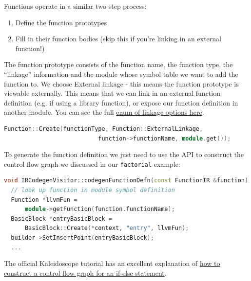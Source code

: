 Functions operate in a similar two step process:

\begin{enumerate}
\tightlist
\item
  Define the function prototypes
\item
  Fill in their function bodies (skip this if you're linking in an
  external function!)
\end{enumerate}

The function prototype consists of the function name, the function type,
the ``linkage'' information and the module whose symbol table we want to
add the function to. We choose External linkage - this means the
function prototype is viewable externally. This means that we can link
in an external function definition (e.g. if using a library function),
or expose our function definition in another module. You can see the
full
\href{https://llvm.org/doxygen/classllvm_1_1GlobalValue.html\#aedfa75f0c85c4aa85b257f066fbea57c}{enum
of linkage options here}.

%

\begin{lstlisting}[caption={function\_codegen.cc},language=C++]
Function::Create(functionType, Function::ExternalLinkage,
                           function->functionName, module.get());
\end{lstlisting}

To generate the function definition we just need to use the API to
construct the control flow graph we discussed in our \texttt{factorial}
example:

%

\begin{lstlisting}[language=C++,caption={function\_codegen.cc}]
void IRCodegenVisitor::codegenFunctionDefn(const FunctionIR &function) {
  // look up function in module symbol definition
  Function *llvmFun =
      module->getFunction(function.functionName);
  BasicBlock *entryBasicBlock =
      BasicBlock::Create(*context, "entry", llvmFun);
  builder->SetInsertPoint(entryBasicBlock);
  ...
\end{lstlisting}

The official Kaleidoscope tutorial has an excellent explanation of
\href{https://llvm.org/docs/tutorial/MyFirstLanguageFrontend/LangImpl05.html\#code-generation-for-if-then-else}{how
to construct a control flow graph for an if-else statement}.


